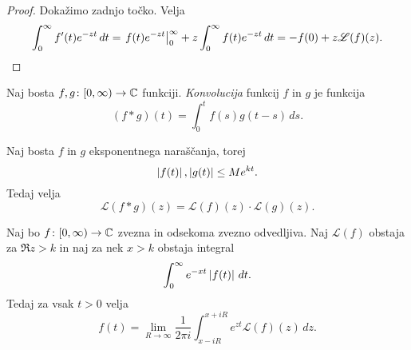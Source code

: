 \begin{proof}
Dokažimo zadnjo točko. Velja
\[
\int_0^\infty f'(t) e^{-zt}\,dt =
\left. f(t) e^{-zt}\right|_{0}^{\infty} + z \int_0^\infty f(t) e^{-zt}\,dt =
-f(0) + z \mathscr{L}(f)(z). \qedhere
\]
\end{proof}

\begin{definicija}
Naj bosta $f, g \colon [0, \infty) \to \mathbb{C}$ funkciji.
\emph{Konvolucija}
funkcij $f$ in $g$ je funkcija
\[
(f*g)(t) = \int_0^t f(s) g(t-s)\,ds.
\]
\end{definicija}

\begin{trditev}
Naj bosta $f$ in $g$ eksponentnega naraščanja, torej
\[
\left\lvert f(t)\right\rvert, \left\lvert g(t)\right\rvert \leq M e^{kt}.
\]
Tedaj velja
\[
\mathscr{L}(f*g)(z) = \mathscr{L}(f)(z) \cdot \mathscr{L}(g)(z).
\]
\end{trditev}

\begin{izrek}
Naj bo $f \colon [0, \infty) \to \mathbb{C}$ zvezna in odsekoma zvezno
odvedljiva. Naj $\mathscr{L}(f)$ obstaja za $\Re z > k$ in naj za
nek $x > k$ obstaja integral
\[
\int_0^\infty e^{-xt} \left\lvert f(t)\right\rvert\,dt.
\]
Tedaj za vsak $t > 0$ velja
\[
f(t) = \lim_{R \to \infty} \frac{1}{2 \pi i}
\int_{x - iR}^{x + iR} e^{zt} \mathscr{L}(f)(z)\,dz.
\]
\end{izrek}
